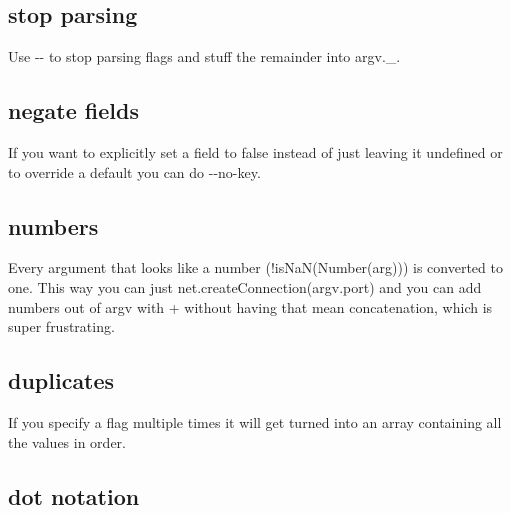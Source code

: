 \subsection*{stop parsing }

Use {\ttfamily -\/-\/} to stop parsing flags and stuff the remainder into {\ttfamily argv.\+\_\+}. 


\subsection*{negate fields }

If you want to explicitly set a field to false instead of just leaving it undefined or to override a default you can do {\ttfamily -\/-\/no-\/key}. 


\subsection*{numbers }

Every argument that looks like a number ({\ttfamily !is\+NaN(Number(arg))}) is converted to one. This way you can just {\ttfamily net.\+create\+Connection(argv.\+port)} and you can add numbers out of {\ttfamily argv} with {\ttfamily +} without having that mean concatenation, which is super frustrating.

\subsection*{duplicates }

If you specify a flag multiple times it will get turned into an array containing all the values in order. 


\subsection*{dot notation }

